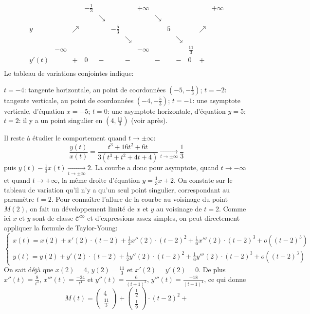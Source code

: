 {\begin{enumerate}
{$$\begin{array}{c|lcccccccccccr}
\ & &\ & -\frac{1}{3}&&&&+\infty&&&&&&+\infty\\
\ & &\ & &\searrow&&&&\searrow&&&&&\\
y&\ &\nearrow & &&-\frac{5}{3}&&&&5&&&\nearrow&\\
\ & &\ & &&&\searrow&&&&\searrow&&&\\
\ &-\infty & & &&&&-\infty&&&&\frac{11}{3}&&\\\hline
y'(t)&& + &0 &-&&-&&-&&-&0&+&\\
\end{array}$$
Le tableau de variations conjointes indique:
\begin{itemize}
$t=-4$: tangente horizontale, au point de coordonnées $(-5,-\frac{1}{3})$;
$t=-2$: tangente verticale, au point de coordonnées $(-4,-\frac{5}{3})$;
$t=-1$: une asymptote verticale, d'équation $x=-5$;
$t=0$: une asymptote horizontale, d'équation $y=5$;
$t=2$: il y a un point singulier en $(4,\frac{11}{3})$ (voir après).
\end{itemize}
Il reste à étudier le comportement quand $t\to\pm\infty$:
$$\frac{y(t)}{x(t)}=\frac{t^3+16t^2+6t}{3(t^3+t^2+4t+4)}\xrightarrow[t\to\pm\infty]{}\frac{1}{3}$$
puis $y(t)-\frac{1}{3}x(t)\xrightarrow[t\to\pm\infty]{}2$. La courbe a donc pour asymptote, quand $t\to-\infty$ et quand $t\to+\infty$, la m\^eme droite d'équation $y=\frac{1}{3}x+2$.
On constate sur le tableau de variation qu'il n'y a qu'un seul point singulier, correspondant au paramètre $t=2$. Pour conna\^itre l'allure de la courbe au voisinage du point $M(2)$, on fait un développement limité de $x$ et $y$ au voisinage de $t=2$. Comme ici $x$ et $y$ sont de classe $\mathcal{C}^\infty$ et d'expressions assez simples, on peut directement appliquer la formule de Taylor-Young:
$$\left\{\begin{array}{l}
x(t)=x(2)+x'(2)\cdot(t-2)+\frac{1}{2}x''(2)\cdot(t-2)^2+\frac{1}{6}x'''(2)\cdot(t-2)^3+o((t-2)^3)\\
y(t)=y(2)+y'(2)\cdot(t-2)+\frac{1}{2}y''(2)\cdot(t-2)^2+\frac{1}{6}y'''(2)\cdot(t-2)^3+o((t-2)^3)
\end{array}\right.$$ 
On sait déjà que $x(2)=4$, $y(2)=\frac{11}{3}$ et $x'(2)=y'(2)=0$. De plus
$x''(t)=\frac{8}{t^3}$, $x'''(t)=\frac{-24}{t^4}$ et $y''(t)=\frac{6}{(t+1)^3}$, $y'''(t)=\frac{-18}{(t+1)^4}$, ce qui donne
$$M(t)=\begin{pmatrix}4 \\ \frac{11}{3}\end{pmatrix}+
\begin{pmatrix}\frac{1}{2}\\\frac{1}{9}\end{pmatrix}\cdot (t-2)^2+
$$}
\end{enumerate}}
